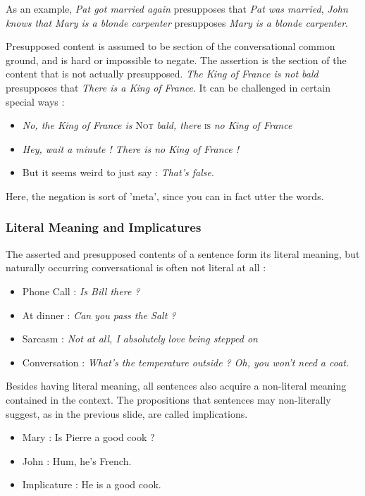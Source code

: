 \documentclass{cours}
\begin{document}
As an example, \textsl{Pat got married again} presupposes that \textsl{Pat was married}, \textsl{John knows that Mary is a blonde carpenter} presupposes \textsl{Mary is a blonde carpenter}.

Presupposed content is assumed to be section of the conversational common ground, and is hard or impossible to negate. The assertion is the section of the content that is not actually presupposed. \textsl{The King of France is not bald} presupposes that \textsl{There is a King of France}. It can be challenged in certain special ways\! :
\begin{itemize}
    \item \textsl{No, the King of France is} \textsc{Not} \textsl{bald, there} \textsc{is} \textsl{no King of France}
    \item \textsl{Hey, wait a minute ! There is no King of France !}
    \item But it seems weird to just say\! : \textsl{That's false}.
\end{itemize}
Here, the negation is sort of 'meta', since you can in fact utter the words.

\subsubsection{Literal Meaning and Implicatures}
The asserted and presupposed contents of a sentence form its literal meaning, but naturally occurring conversational is often not literal at all\! :
\begin{itemize}
    \item Phone Call\! : \textsl{Is Bill there ? }
    \item At dinner\! : \textsl{Can you pass the Salt ?}
    \item Sarcasm\! : \textsl{Not at all, I absolutely} \emph{love} \textsl{being stepped on}
    \item Conversation\! : \textsl{What's the temperature outside ? Oh, you won't need a coat.}
\end{itemize}
Besides having literal meaning, all sentences also acquire a non-literal meaning contained in the context. The propositions that sentences may non-literally suggest, as in the previous slide, are called implications. 

\begin{itemize}
    \item Mary\! : Is Pierre a good cook ? 
    \item John\! : Hum, he's French.
    \item Implicature\! : He is a good cook.
\end{itemize}
\end{document}

